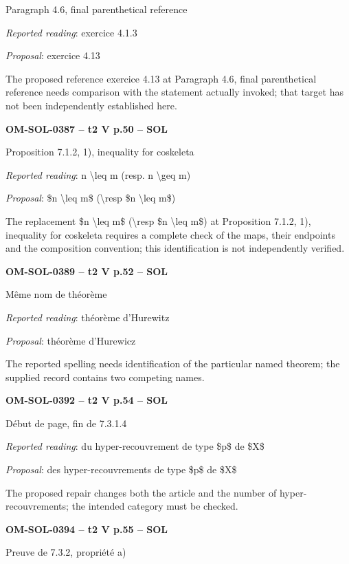 Paragraph 4.6, final parenthetical reference\par
\emph{Reported reading}: exercice 4.1.3\par
\emph{Proposal}: exercice 4.13\par
The proposed reference exercice 4.13 at Paragraph 4.6, final parenthetical reference needs comparison with the statement actually invoked; that target has not been independently established here.\par
\par\noindent\textbf{OM-SOL-0387 -- t2 V p.50 -- SOL}\par
Proposition 7.1.2, 1), inequality for coskeleta\par
\emph{Reported reading}: n \textbackslash{}leq m (resp. n \textbackslash{}geq m)\par
\emph{Proposal}: \$n \textbackslash{}leq m\$ (\textbackslash{}resp \$n \textbackslash{}leq m\$)\par
The replacement \$n \textbackslash{}leq m\$ (\textbackslash{}resp \$n \textbackslash{}leq m\$) at Proposition 7.1.2, 1), inequality for coskeleta requires a complete check of the maps, their endpoints and the composition convention; this identification is not independently verified.\par
\par\noindent\textbf{OM-SOL-0389 -- t2 V p.52 -- SOL}\par
Même nom de théorème\par
\emph{Reported reading}: théorème d'Hurewitz\par
\emph{Proposal}: théorème d'Hurewicz\par
The reported spelling needs identification of the particular named theorem; the supplied record contains two competing names.\par
\par\noindent\textbf{OM-SOL-0392 -- t2 V p.54 -- SOL}\par
Début de page, fin de 7.3.1.4\par
\emph{Reported reading}: du hyper-recouvrement de type \$p\$ de \$X\$\par
\emph{Proposal}: des hyper-recouvrements de type \$p\$ de \$X\$\par
The proposed repair changes both the article and the number of hyper-recouvrements; the intended category must be checked.\par
\par\noindent\textbf{OM-SOL-0394 -- t2 V p.55 -- SOL}\par
Preuve de 7.3.2, propriété a)\par
